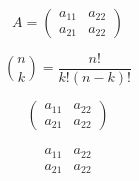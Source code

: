 \documentclass{article}
\begin{document}
\begin{displaymath}
  A = \left(
    \begin{array}{cc}
      a_{11} & a_{22} \\
      a_{21} & a_{22}
    \end{array}
  \right)
\end{displaymath}

\[
  \binom{n}{k} = \frac{n!}{k!(n-k)!}
\]

\[
  \begin{pmatrix}
    a_{11} & a_{22} \\
    a_{21} & a_{22}
  \end{pmatrix}
\]

\[
  \begin{smallmatrix}
    a_{11} & a_{22} \\
    a_{21} & a_{22}
  \end{smallmatrix}
\]
\end{document}
